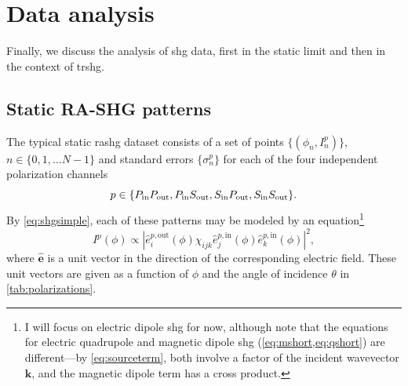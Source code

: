 \section{Data analysis}\label{sec:dataanalysis}

Finally, we discuss the analysis of \gls{shg} data, first in the static limit and then in the context of \gls{trshg}.

\subsection{Static RA-SHG patterns}\label{sec:staticanalysis}

The typical static \gls{rashg} dataset consists of a set of points $\{(\phi_n, I^p_n)\}$, $n \in \{0, 1, \ldots N-1\}$ and standard errors $\{\sigma^p_n\}$ for each of the four independent polarization channels
\[
p\in\{P_\mathrm{in}P_\mathrm{out}, P_\mathrm{in}S_\mathrm{out}, S_\mathrm{in}P_\mathrm{out}, S_\mathrm{in}S_\mathrm{out}\}.
\]
By \cref{eq:shgsimple}, each of these patterns may be modeled by an equation\footnote{I will focus on electric dipole \gls{shg} for now, although note that the equations for electric quadrupole and magnetic dipole \gls{shg} (\cref{eq:mshort,eq:qshort}) are different---by \cref{eq:sourceterm}, both involve a factor of the incident wavevector $\bm{k}$, and the magnetic dipole term has a cross product.}
\begin{equation}\label{eq:fundamentalmodel}
I^p(\phi) \propto |\hat{e}_i^{p,\mathrm{out}}(\phi)\chi_{ijk}\hat{e}_j^{p,\mathrm{in}}(\phi)\hat{e}_k^{p,\mathrm{in}}(\phi)|^2,
\end{equation}
where $\hat{\bm{e}}$ is a unit vector in the direction of the corresponding electric field.
These unit vectors are given as a function of $\phi$ and the angle of incidence $\theta$ in \cref{tab:polarizations}.


